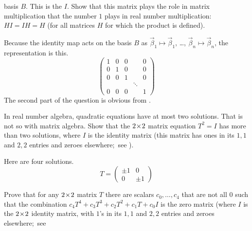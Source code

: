\begin{exercises}
    basis $B$.
    This is the  $I$.
    Show that this matrix plays the role in matrix multiplication that the
    number $1$ plays in real number multiplication:~$HI=IH=H$ (for all matrices
    $H$ for which the product is defined).
    \begin{answer}
      Because the identity map acts on the basis $B$ as
      $\vec{\beta}_1\mapsto\vec{\beta}_1$, \ldots,
      $\vec{\beta}_n\mapsto\vec{\beta}_n$,
      the representation is this.
      \begin{equation*}
        \begin{pmatrix}
          1  &0  &0  &  &0 \\
          0  &1  &0  &  &0 \\
          0  &0  &1  &  &0 \\
             &   &   &\ddots  \\
          0  &0  &0  &  &1
        \end{pmatrix}
      \end{equation*}
      The second part of the question is obvious from 
      .
    \end{answer}
  \item 
    In real number algebra, quadratic equations have at most two solutions.
    That is not so with matrix algebra.
    Show that the \( 2 \! \times \! 2 \) matrix equation \( T^2=I \)
    has more than two solutions,
    where $I$ is the identity matrix
    (this matrix has ones in its $1,1$ and $2,2$ entries and zeroes 
    elsewhere;~see ).
    \begin{answer}
      Here are four solutions.
      \begin{equation*}
        T=\begin{pmatrix}
          \pm 1  &0  \\
          0      &\pm 1
        \end{pmatrix}
      \end{equation*}  
    \end{answer}
  \item 
    \begin{exparts}
      \partsitem Prove that for any \( 2 \! \times \! 2 \) matrix \( T \) 
        there are scalars
        \( c_0,\dots,c_4 \) that are not all $0$ such that the combination
        $c_4T^4+c_3T^3+c_2T^2+c_1T+c_0I$
        is the zero matrix
        (where $I$ is the $2 \! \times \! 2$ identity matrix, with $1$'s in its
        $1,1$ and $2,2$ entries and zeroes elsewhere;~see

\end{exparts}
\end{exercises}
